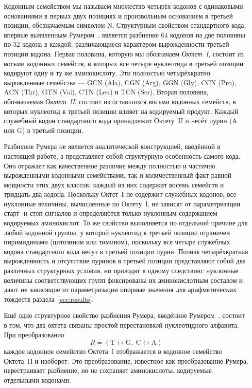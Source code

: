 \documentclass[11pt,a4paper]{article}
\renewcommand{\_}{\origunderscore\allowbreak}
\begin{document}
Кодонным семейством мы называем множество четырёх кодонов с
одинаковыми основаниями в первых двух позициях и произвольным
основанием в третьей позиции, обозначаемым символом $\mathrm{N}$.
Структурным свойством стандартного кода, впервые выявленным
Румером~\cite{rumer1966,rumer1968}, является разбиение $64$ кодонов
на две половины по $32$ кодона в каждой, различающиеся характером
вырожденности третьей позиции кодона. Первая половина, которую мы
обозначаем \emph{Октет~I}, состоит из восьми кодонных семейств,
в которых все четыре нуклеотида в третьей позиции кодируют одну
и ту же аминокислоту. Эти полностью четырёхкратно вырожденные
семейства --- $\mathrm{GCN}$ (Ala), $\mathrm{CGN}$ (Arg),
$\mathrm{GGN}$ (Gly), $\mathrm{CCN}$ (Pro), $\mathrm{ACN}$ (Thr),
$\mathrm{GTN}$ (Val), $\mathrm{CTN}$ (Leu) и $\mathrm{TCN}$ (Ser).
Вторая половина, обозначаемая \emph{Октет~II}, состоит из оставшихся
восьми кодонных семейств, в которых нуклеотид в третьей позиции
влияет на кодируемый продукт. Каждый служебный кодон стандартного
кода принадлежит Октету~II и несёт пурин ($\mathrm{A}$ или
$\mathrm{G}$) в третьей позиции.

Разбиение Румера не является аналитической конструкцией, введённой
в настоящей работе, а представляет собой структурную особенность
самого кода. Оно отражает как качественное различие между полностью
и частично вырожденными кодонными семействами, так и количественный
факт равной мощности этих двух классов: каждый из них содержит
восемь семейств и тридцать два кодона. Поскольку Октет~I не содержит
служебных кодонов, все нуклонные величины, вычисленные по Октету~I,
не зависят от параметризации старт- и стоп-сигналов и определяются
только нуклонным содержанием кодируемых аминокислот. То же свойство
выполняется по отдельной причине для любой кодонной группы, у которой
нуклеотид в третьей позиции ограничен пиримидинами (цитозином или
тимином), поскольку все четыре служебных кодона стандартного кода
несут в третьей позиции пурин. Полная четырёхкратная вырожденность
и отсутствие пуринов в третьей позиции представляют собой два
различных структурных условия, но приводят к одному следствию:
нуклонные величины соответствующих групп фиксированы их
аминокислотным составом и дают не зависящие от параметризации
опорные значения для арифметических тождеств
раздела~\ref{sec:results}.

Ещё одно структурное свойство разбиения Румера, введённое
Румером~\cite{rumer1968}, состоит в том, что два октета связаны
простой перестановкой нуклеотидного алфавита. При преобразовании
\[
R =
(\mathrm{T} \leftrightarrow \mathrm{G},\;
 \mathrm{C} \leftrightarrow \mathrm{A})
\]
каждое кодонное семейство Октета~I отображается в кодонное семейство
Октета~II и наоборот. Это преобразование, известное как
преобразование Румера, перестраивает разбиение, но не сохраняет
аминокислоты, кодируемые отдельными кодонами.
\end{document}
